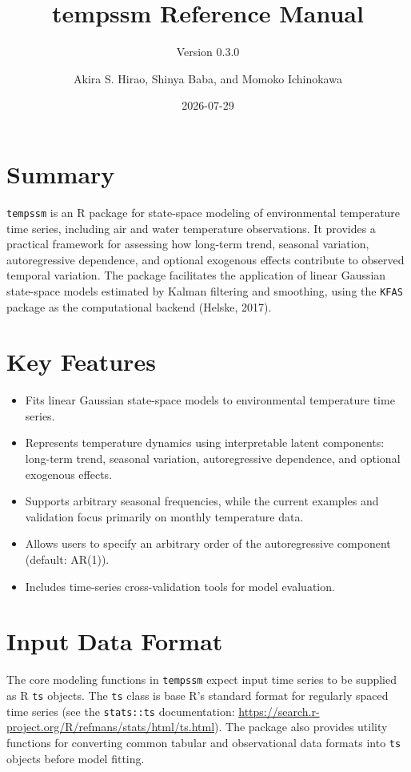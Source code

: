 \documentclass[
]{article}
\title{tempssm Reference Manual}
\subtitle{Version 0.3.0}
\author{Akira S. Hirao, Shinya Baba, and Momoko Ichinokawa}
\date{2026-07-29}
\providecommand{\tightlist}{%
  \setlength{\itemsep}{0pt}\setlength{\parskip}{0pt}}
\begin{document}
\maketitle

\section{Summary}\label{summary}

\texttt{tempssm} is an R package for state-space modeling of
environmental temperature time series, including air and water
temperature observations. It provides a practical framework for
assessing how long-term trend, seasonal variation, autoregressive
dependence, and optional exogenous effects contribute to observed
temporal variation. The package facilitates the application of linear
Gaussian state-space models estimated by Kalman filtering and smoothing,
using the \texttt{KFAS} package as the computational backend (Helske,
2017).

\section{Key Features}\label{key-features}

\begin{itemize}
\tightlist
\item
  Fits linear Gaussian state-space models to environmental temperature
  time series.
\item
  Represents temperature dynamics using interpretable latent components:
  long-term trend, seasonal variation, autoregressive dependence, and
  optional exogenous effects.
\item
  Supports arbitrary seasonal frequencies, while the current examples
  and validation focus primarily on monthly temperature data.
\item
  Allows users to specify an arbitrary order of the autoregressive
  component (default: AR(1)).
\item
  Includes time-series cross-validation tools for model evaluation.
\end{itemize}

\section{Input Data Format}\label{input-data-format}

The core modeling functions in \texttt{tempssm} expect input time series
to be supplied as R \texttt{ts} objects. The \texttt{ts} class is base
R's standard format for regularly spaced time series (see the
\texttt{stats::ts} documentation:
\url{https://search.r-project.org/R/refmans/stats/html/ts.html}). The
package also provides utility functions for converting common tabular
and observational data formats into \texttt{ts} objects before model
fitting.
\end{document}
